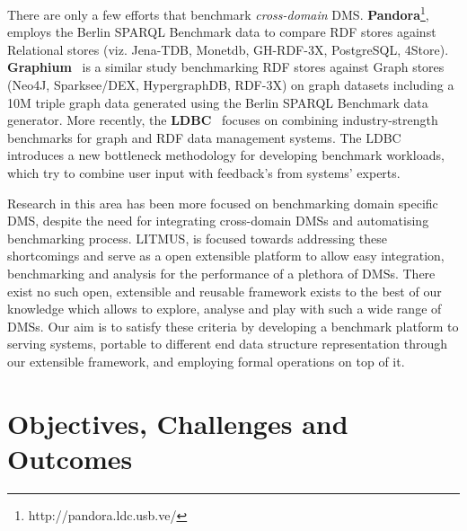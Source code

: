 \documentclass{llncs}
\begin{document}
    There are only a few efforts that benchmark \textit{cross-domain} DMS. \textbf{Pandora}\footnote{http://pandora.ldc.usb.ve/}, employs the Berlin SPARQL Benchmark data to compare RDF stores against Relational stores (viz. Jena-TDB, Monetdb, GH-RDF-3X, PostgreSQL, 4Store). \textbf{Graphium}~\cite{flores2013graphium} is a similar study benchmarking RDF stores against Graph stores (Neo4J, Sparksee/DEX, HypergraphDB, RDF-3X) on graph datasets including a 10M triple graph data generated using the Berlin SPARQL Benchmark data generator. More recently, the \textbf{LDBC}~\cite{DBLP:journals/sigmod/AnglesBLF0ENMKT14} focuses on combining industry-strength benchmarks for graph and RDF data management systems.
    The LDBC introduces a new bottleneck methodology for developing benchmark workloads, which try to combine user input with feedback's from systems' experts.
    
    Research in this area has been more focused on benchmarking domain specific DMS, despite the need for integrating cross-domain DMSs and automatising benchmarking process. LITMUS, is focused towards addressing these shortcomings and serve as a open extensible platform to allow easy integration, benchmarking and analysis for the performance of a plethora of DMSs. There exist no such open, extensible and reusable framework exists to the best of our knowledge which allows to explore, analyse and play with such a wide range of DMSs.
    Our aim is to satisfy these criteria by developing a benchmark platform to serving systems, portable to different end data structure representation through our extensible framework, and employing formal operations on top of it.
    

\section{Objectives, Challenges and Outcomes}\label{Objectives}
\end{document}

